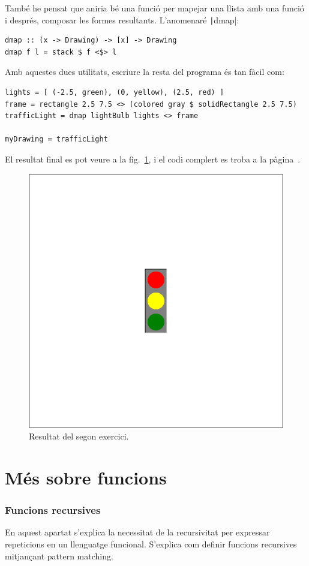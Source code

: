 \documentclass[catalan, a4paper]{scrartcl}
\begin{document}
També he pensat que aniria bé una funció per mapejar una llista amb
una funció i després, composar les formes resultants. L'anomenaré
\texttt|dmap|:

\begin{verbatim}
dmap :: (x -> Drawing) -> [x] -> Drawing
dmap f l = stack $ f <$> l
\end{verbatim}

Amb aquestes dues utilitats, escriure la resta del programa és tan
fàcil com:

\begin{verbatim}
lights = [ (-2.5, green), (0, yellow), (2.5, red) ]
frame = rectangle 2.5 7.5 <> (colored gray $ solidRectangle 2.5 7.5)
trafficLight = dmap lightBulb lights <> frame

myDrawing = trafficLight
\end{verbatim}

El resultat final es pot veure a la fig.~\ref{fig:ex2}, i el codi complert
es troba a la pàgina~\pageref{code-ex2}.

\begin{figure}
\centering
\includegraphics[width=0.5\columnwidth]{../p2/ex2.pdf}
\caption{\label{fig:ex2} Resultat del segon exercici.}
\end{figure}

\clearpage
\part{Més sobre funcions}

\section{Funcions recursives}

En aquest apartat s'explica la necessitat de la recursivitat per expressar
repeticions en un llenguatge funcional. S'explica com definir funcions
recursives mitjançant pattern matching.
\end{document}
